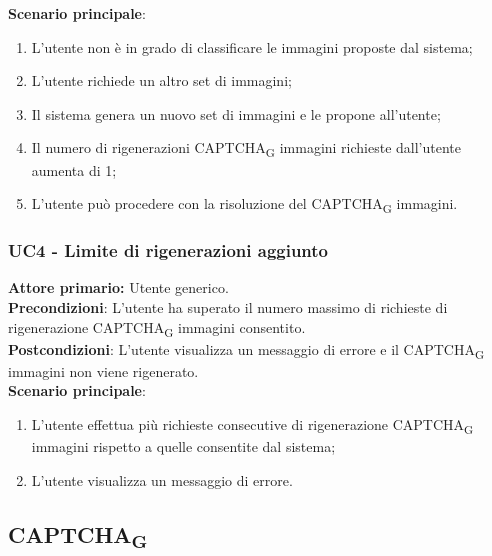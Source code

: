 \textbf{Scenario principale}:
\begin{enumerate}
   \item L'utente non è in grado di classificare le immagini proposte dal sistema;
   \item L'utente richiede un altro set di immagini;
   \item Il sistema genera un nuovo set di immagini e le propone all'utente;
   \item Il numero di rigenerazioni CAPTCHA\textsubscript{G} immagini richieste dall’utente aumenta di 1;
   \item L'utente può procedere con la risoluzione del CAPTCHA\textsubscript{G} immagini.
\end{enumerate}

\subsubsection{UC4 - Limite di rigenerazioni aggiunto}
\textbf{Attore primario:} Utente generico.\\
\textbf{Precondizioni}: L'utente ha superato il numero massimo di richieste di rigenerazione CAPTCHA\textsubscript{G} immagini consentito.\\
\textbf{Postcondizioni}: L’utente visualizza un messaggio di errore e il CAPTCHA\textsubscript{G} immagini non viene rigenerato.\\

\textbf{Scenario principale}:
\begin{enumerate}
    \item L'utente effettua più richieste consecutive di rigenerazione CAPTCHA\textsubscript{G} immagini rispetto a quelle consentite dal sistema;
	\item L’utente visualizza un messaggio di errore.
\end{enumerate}

\subsection{CAPTCHA\textsubscript{G}}

